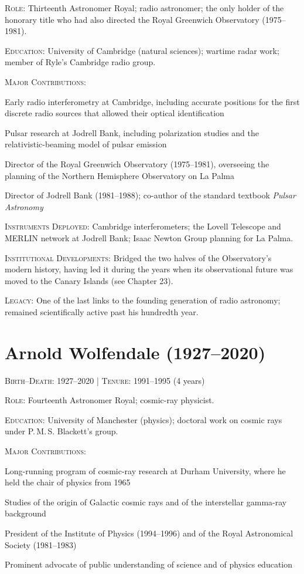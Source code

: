 \noindent\textsc{Role}: Thirteenth Astronomer Royal; radio astronomer; the only holder of the honorary title who had also directed the Royal Greenwich Observatory (1975--1981).

\noindent\textsc{Education}: University of Cambridge (natural sciences); wartime radar work; member of Ryle's Cambridge radio group.

\noindent\textsc{Major Contributions}:
\begin{enumerate*}[label=(\arabic*)]
\item Early radio interferometry at Cambridge, including accurate positions for the first discrete radio sources that allowed their optical identification
\item Pulsar research at Jodrell Bank, including polarization studies and the relativistic-beaming model of pulsar emission
\item Director of the Royal Greenwich Observatory (1975--1981), overseeing the planning of the Northern Hemisphere Observatory on La Palma
\item Director of Jodrell Bank (1981--1988); co-author of the standard textbook \emph{Pulsar Astronomy}
\end{enumerate*}

\noindent\textsc{Instruments Deployed}: Cambridge interferometers; the Lovell Telescope and MERLIN network at Jodrell Bank; Isaac Newton Group planning for La Palma.

\noindent\textsc{Institutional Developments}: Bridged the two halves of the Observatory's modern history, having led it during the years when its observational future was moved to the Canary Islands (see Chapter 23).

\noindent\textsc{Legacy}: One of the last links to the founding generation of radio astronomy; remained scientifically active past his hundredth year.

\medskip

\section*{Arnold Wolfendale (1927--2020)}
\textsc{Birth--Death}: 1927--2020 | \textsc{Tenure}: 1991--1995 (4 years)

\noindent\textsc{Role}: Fourteenth Astronomer Royal; cosmic-ray physicist.

\noindent\textsc{Education}: University of Manchester (physics); doctoral work on cosmic rays under P.\,M.\,S. Blackett's group.

\noindent\textsc{Major Contributions}:
\begin{enumerate*}[label=(\arabic*)]
\item Long-running program of cosmic-ray research at Durham University, where he held the chair of physics from 1965
\item Studies of the origin of Galactic cosmic rays and of the interstellar gamma-ray background
\item President of the Institute of Physics (1994--1996) and of the Royal Astronomical Society (1981--1983)
\item Prominent advocate of public understanding of science and of physics education
\end{enumerate*}

